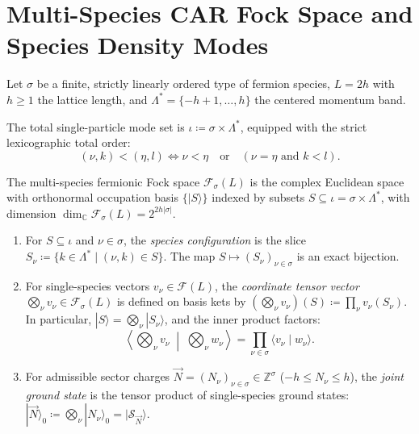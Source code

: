\section{Multi-Species CAR Fock Space and Species Density Modes}

Let $\sigma$ be a finite, strictly linearly ordered type of fermion species, $L = 2h$ with $h \ge 1$ the lattice length, and $\Lambda^* = \{-h+1, \dots, h\}$ the centered momentum band.

\begin{definition}
\label{def:species_modes}
The total single-particle mode set is $\iota \coloneqq \sigma \times \Lambda^*$, equipped with the strict lexicographic total order:
\begin{equation}
\label{eq:lexicographic_order}
(\nu, k) < (\eta, l) \iff \nu < \eta \quad \text{or} \quad (\nu = \eta \text{ and } k < l).
\end{equation}
\end{definition}

\begin{definition}
\label{def:multispecies_fock}
The multi-species fermionic Fock space $\mathcal{F}_\sigma(L)$ is the complex Euclidean space with orthonormal occupation basis $\{|S\rangle\}$ indexed by subsets $S \subseteq \iota = \sigma \times \Lambda^*$, with dimension $\dim_{\mathbb{C}} \mathcal{F}_\sigma(L) = 2^{2h |\sigma|}$.
\begin{enumerate}
    \item For $S \subseteq \iota$ and $\nu \in \sigma$, the \emph{species configuration} is the slice $S_\nu \coloneqq \{k \in \Lambda^* \mid (\nu, k) \in S\}$. The map $S \mapsto (S_\nu)_{\nu \in \sigma}$ is an exact bijection.
    \item For single-species vectors $v_\nu \in \mathcal{F}(L)$, the \emph{coordinate tensor vector} $\bigotimes_\nu v_\nu \in \mathcal{F}_\sigma(L)$ is defined on basis kets by $(\bigotimes_\nu v_\nu)(S) \coloneqq \prod_\nu v_\nu(S_\nu)$. In particular, $|S\rangle = \bigotimes_\nu |S_\nu\rangle$, and the inner product factors:
    \begin{equation}
    \label{eq:tensor_inner}
    \left\langle \bigotimes_\nu v_\nu \;\middle|\; \bigotimes_\nu w_\nu \right\rangle = \prod_{\nu \in \sigma} \langle v_\nu \mid w_\nu \rangle.
    \end{equation}
    \item For admissible sector charges $\vec{N} = (N_\nu)_{\nu \in \sigma} \in \mathbb{Z}^\sigma$ ($-h \le N_\nu \le h$), the \emph{joint ground state} is the tensor product of single-species ground states: $|\vec{N}\rangle_0 \coloneqq \bigotimes_\nu |N_\nu\rangle_0 = |\mathcal{S}_{\vec{N}}\rangle$.
\end{enumerate}
\end{definition}

